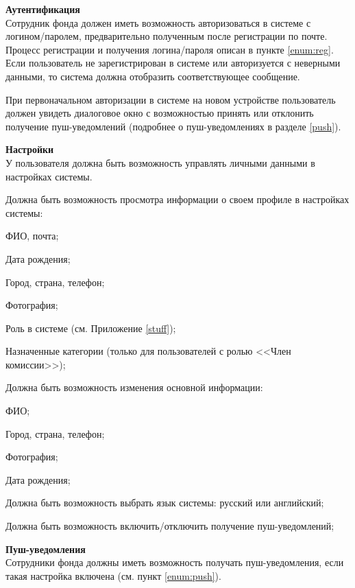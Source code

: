  

\begin{subreg}
    \item \label{FR-1} \textbf{Аутентификация\\} 
	Сотрудник фонда должен иметь возможность авторизоваться в системе с логином/паролем, предварительно полученным после регистрации по почте. Процесс регистрации и получения логина/пароля описан в пункте \ref{enum:reg}. Если пользователь не зарегистрирован в системе или авторизуется с неверными данными, то система должна отобразить соответствующее сообщение. 
	
	При первоначальном авторизации в системе на новом устройстве пользователь должен увидеть диалоговое окно с возможностью принять или отклонить получение пуш-уведомлений (подробнее о пуш-уведомлениях в разделе \ref{push}).
	
	\item \textbf{Настройки\\}
    У пользователя должна быть возможность управлять личными данными в настройках системы.
    \begin{subreg} \label{settings}
        \item Должна быть возможность просмотра информации о своем профиле в настройках системы:
        \begin{subreg}
        \item ФИО, почта;
        \item Дата рождения;
        \item Город, страна, телефон;
        \item Фотография;
        \item Роль в системе (см. Приложение \ref{stuff});
        \item Назначенные категории (только для пользователей с ролью <<Член комиссии>>);
        \end{subreg}
        \item Должна быть возможность изменения основной информации:
    \begin{subreg}
        \item ФИО;
        \item Город, страна, телефон;
        \item Фотография;
        \item Дата рождения;
    \end{subreg}
        \item Должна быть возможность выбрать язык системы: русский или английский;
        \item \label{enum:push} Должна быть возможность включить/отключить получение пуш-уведомлений; 
    \end{subreg}
    \item \textbf{Пуш-уведомления\\} \label{push}
    Сотрудники фонда должны иметь возможность получать пуш-уведомления, если такая настройка включена (см. пункт \ref{enum:push}).
    

\end{subreg}
